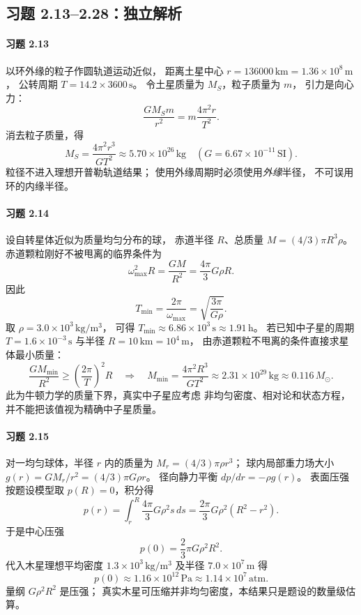 \subsection*{习题 2.13--2.28：独立解析}

\paragraph{习题 2.13}
以环外缘的粒子作圆轨道运动近似，
距离土星中心 \(r=136000\,\mathrm{km}
=1.36\times10^8\,\mathrm m\)，
公转周期 \(T=14.2\times3600\,\mathrm s\)。
令土星质量为 \(M_S\)，粒子质量为 \(m\)，
引力是向心力：
\[
 \frac{GM_Sm}{r^2}
 =m\frac{4\pi^2r}{T^2}.
\]
消去粒子质量，得
\[
 \boxed{M_S=\frac{4\pi^2r^3}{GT^2}}
 \approx5.70\times10^{26}\,\mathrm{kg}
 \quad (G=6.67\times10^{-11}\,\mathrm{SI}).
\]
粒径不进入理想开普勒轨道结果；
使用外缘周期时必须使用\emph{外缘}半径，
不可误用环的内缘半径。

\paragraph{习题 2.14}
设自转星体近似为质量均匀分布的球，
赤道半径 \(R\)、总质量 \(M=(4/3)\pi R^3\rho\)。
赤道颗粒刚好不被甩离的临界条件为
\[
 \omega_{\max}^2R=\frac{GM}{R^2}
 =\frac{4\pi}{3}G\rho R.
\]
因此
\[
 \boxed{T_{\min}=\frac{2\pi}{\omega_{\max}}
 =\sqrt{\frac{3\pi}{G\rho}}}.
\]
取 \(\rho=3.0\times10^3\,\mathrm{kg/m^3}\)，
可得 \(T_{\min}\approx6.86\times10^3\,\mathrm s
\approx1.91\,\mathrm h\)。
若已知中子星的周期 \(T=1.6\times10^{-3}\,\mathrm s\)
与半径 \(R=10\,\mathrm{km}=10^4\,\mathrm m\)，
由赤道颗粒不甩离的条件直接求星体最小质量：
\[
 \frac{GM_{\min}}{R^2}\ge
 \left(\frac{2\pi}{T}\right)^2R
 \quad\Longrightarrow\quad
 \boxed{M_{\min}=\frac{4\pi^2R^3}{GT^2}}
 \approx2.31\times10^{29}\,\mathrm{kg}
 \approx0.116\,M_\odot.
\]
此为牛顿力学的质量下界，真实中子星应考虑
非均匀密度、相对论和状态方程，
并不能把该值视为精确中子星质量。

\paragraph{习题 2.15}
对一均匀球体，半径 \(r\) 内的质量为
\(M_r=(4/3)\pi\rho r^3\)；
球内局部重力场大小
\(g(r)=GM_r/r^2=(4/3)\pi G\rho r\)。
径向静力平衡
\(dp/dr=-\rho g(r)\)。
表面压强按题设模型取 \(p(R)=0\)，积分得
\[
 p(r)=\int_r^R\frac{4\pi}{3}G\rho^2s\,ds
 =\frac{2\pi}{3}G\rho^2(R^2-r^2).
\]
于是中心压强
\[
 \boxed{p(0)=\frac23\pi G\rho^2R^2}.
\]
代入木星理想平均密度
\(1.3\times10^3\,\mathrm{kg/m^3}\)
及半径 \(7.0\times10^7\,\mathrm m\) 得
\[
 p(0)\approx1.16\times10^{12}\,\mathrm{Pa}
 \approx\boxed{1.14\times10^7\,\mathrm{atm}}.
\]
量纲 \(G\rho^2R^2\) 是压强；
真实木星可压缩并非均匀密度，本结果只是题设的数量级估算。

